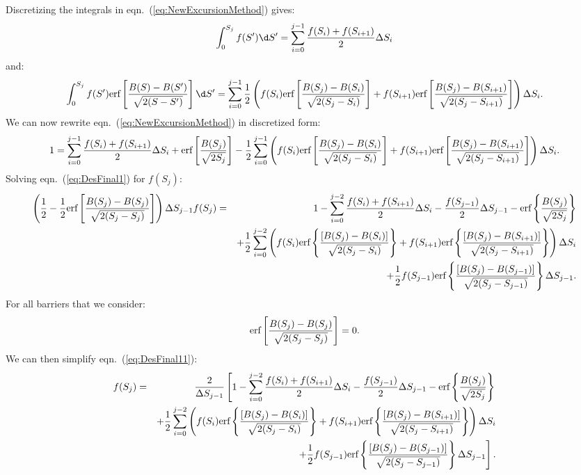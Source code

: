 Discretizing the integrals in eqn.~(\ref{eq:NewExcursionMethod}) gives:
\begin{equation} \label{eq:Des1}
 \int_0^{S_j} f(S^\prime)\d S^\prime = \sum_{i=0}^{j-1} \frac{f(S_i) + f(S_{i+1})}{2} \Delta S_i
\end{equation}
and:
\begin{equation} \label{eq:Des2}
 \int_{0}^{S_j}  f(S^\prime)  \hbox{erf}\left[\frac{B(S) - B(S^\prime)}{\sqrt{2 (S-S^\prime)}}\right] \d S^\prime = \sum_{i=0}^{j-1} \frac{1}{2} \left(f(S_i)  \hbox{erf}\left[\frac{B(S_j) - B(S_i)}{\sqrt{2 (S_j-S_i)}}\right] + f(S_{i+1})  \hbox{erf}\left[\frac{B(S_j) - B(S_{i+1})}{\sqrt{2 (S_j-S_{i+1})}}\right] \right) \Delta S_i.
\end{equation}
We can now rewrite eqn.~(\ref{eq:NewExcursionMethod}) in discretized form:
\begin{equation} \label{eq:DesFinal1}
 1 = \sum_{i=0}^{j-1} \frac{f(S_i) + f(S_{i+1})}{2} \Delta S_i  +  \hbox{erf}\left[\frac{B(S_j)}{\sqrt{2S_j}}\right] - \frac{1}{2} \sum_{i=0}^{j-1} \left( f(S_i)  \hbox{erf}\left[\frac{B(S_j) - B(S_i)}{\sqrt{2 (S_j-S_i)}}\right] + f(S_{i+1})  \hbox{erf}\left[\frac{B(S_j) - B(S_{i+1})}{\sqrt{2 (S_j-S_{i+1})}}\right]  \right)  \Delta S_i.
\end{equation}
Solving eqn.~(\ref{eq:DesFinal1}) for $f(S_j)$:
\begin{eqnarray} \label{eq:DesFinal11}
 \left( \frac{1}{2} - \frac{1}{2} \hbox{erf}\left[\frac{B(S_j) - B(S_j)}{\sqrt{2 (S_j-S_j)}}\right] \right) \Delta S_{j-1} f(S_j) &=& 1 - \sum_{i=0}^{j-2} \frac{f(S_i) + f(S_{i+1})}{2} \Delta S_i - \frac{f(S_{j-1})}{2} \Delta S_{j-1} -  \hbox{erf}\left\{\frac{B(S_j)}{\sqrt{2S_j}}\right\}   \nonumber\\
& & + \frac{1}{2} \sum_{i=0}^{j-2} \left( f(S_i)  \hbox{erf}\left\{\frac{[B(S_j) - B(S_i)]}{\sqrt{2 (S_j-S_i)}}\right\} + f(S_{i+1})  \hbox{erf}\left\{\frac{[B(S_j) - B(S_{i+1})]}{\sqrt{2 (S_j-S_{i+1})}}\right\} \right)\Delta S_i  \nonumber \\
 & & + \frac{1}{2} f(S_{j-1})  \hbox{erf}\left\{\frac{[B(S_j) - B(S_{j-1})]}{\sqrt{2 (S_j-S_{j-1})}}\right\} \Delta S_{j-1}.
\end{eqnarray}
For all barriers that we consider:
\begin{equation} 
\hbox{erf}\left[\frac{B(S_j) - B(S_j)}{\sqrt{2 (S_j-S_j)}}\right] = 0.
\end{equation}
We can then simplify eqn.~(\ref{eq:DesFinal11}):
\begin{eqnarray} \label{eq:DesFinal2}
   f(S_j) &=& {2 \over \Delta S_{j-1}}\left[1 - \sum_{i=0}^{j-2} \frac{f(S_i) + f(S_{i+1})}{2} \Delta S_i - \frac{f(S_{j-1})}{2} \Delta S_{j-1} -  \hbox{erf}\left\{\frac{B(S_j)}{\sqrt{2S_j}}\right\} \right.  \nonumber\\
& & + \frac{1}{2} \sum_{i=0}^{j-2} \left( f(S_i)  \hbox{erf}\left\{\frac{[B(S_j) - B(S_i)]}{\sqrt{2 (S_j-S_i)}}\right\} + f(S_{i+1})  \hbox{erf}\left\{\frac{[B(S_j) - B(S_{i+1})]}{\sqrt{2 (S_j-S_{i+1})}}\right\} \right)\Delta S_i  \nonumber \\
 & & \left. + \frac{1}{2} f(S_{j-1})  \hbox{erf}\left\{\frac{[B(S_j) - B(S_{j-1})]}{\sqrt{2 (S_j-S_{j-1})}}\right\} \Delta S_{j-1}\right].
\end{eqnarray}
